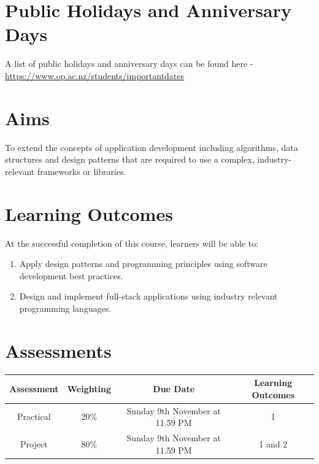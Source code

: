 \documentclass{article}
\begin{document}
\section*{Public Holidays and Anniversary Days}
A list of public holidays and anniversary days can be found here - \href{https://www.op.ac.nz/students/importantdates}{https://www.op.ac.nz/students/importantdates}

\section*{Aims}
To extend the concepts of application development including algorithms, data structures and design patterns that are required to use a complex, industry-relevant frameworks or libraries.

\section*{Learning Outcomes}
At the successful completion of this course, learners will be able to:
\begin{enumerate}
	\item Apply design patterns and programming principles using software development best practices.
	\item Design and implement full-stack applications using industry relevant programming languages.
\end{enumerate}

\section*{Assessments}
\renewcommand{\arraystretch}{1.5}
\begin{tabular}{|c|c|c|c|}
	\hline
	\textbf{Assessment}                                 & \textbf{Weighting} & \textbf{Due Date}            & \textbf{Learning Outcomes} \\ \hline
	\small Practical & \small 20\%        & \small Sunday 9th November at 11.59 PM  & \small 1                   \\ \hline
	\small Project                 & \small 80\%        & \small Sunday 9th November at 11.59 PM \small  & \small 1 and 2                   \\ \hline
\end{tabular}
\end{document}

